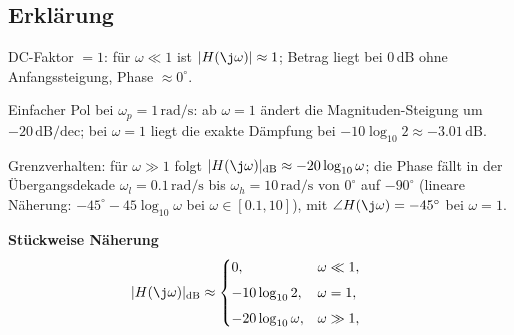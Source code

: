\subsection{Erklärung}
\vspace{5mm}
\begin{description}[leftmargin=1.2em,labelsep=.6em,font=\bfseries]
\item[Schritt 1] DC-Faktor $= 1$: für $\omega\ll1$ ist $|H(\j\omega)|\approx1$; Betrag liegt bei $0\,\mathrm{dB}$ ohne Anfangssteigung, Phase $\approx0^\circ$.
\item[Schritt 2] Einfacher Pol bei $\omega_p=1\,\mathrm{rad/s}$: ab $\omega=1$ ändert die Magnituden-Steigung um $-20\,\mathrm{dB/dec}$; bei $\omega=1$ liegt die exakte Dämpfung bei $-10\log_{10}2\approx-3.01\,\mathrm{dB}$.
\item[Schritt 3] Grenzverhalten: für $\omega\gg1$ folgt $|H(\j\omega)|_{\mathrm{dB}}\approx-20\log_{10}\omega$; die Phase fällt in der Übergangsdekade $\omega_l=0.1\,\mathrm{rad/s}$ bis $\omega_h=10\,\mathrm{rad/s}$ von $0^\circ$ auf $-90^\circ$ (lineare Näherung: $-45^\circ-45\log_{10}\omega$ bei $\omega\in[0.1,10]$), mit $\angle H(\j\omega)= -45^\circ$ bei $\omega=1$.
\end{description}

\vspace{0.5cm}
\medskip
\noindent\textbf{Stückweise Näherung}
\[
|H(\j\omega)|_{\mathrm{dB}}\approx
\begin{cases}
0,& \omega\ll1,\\[4pt]
-10\log_{10}2,& \omega=1,\\[4pt]
-20\log_{10}\omega,& \omega\gg1,
\end{cases}
\qquad
\]
\newpage